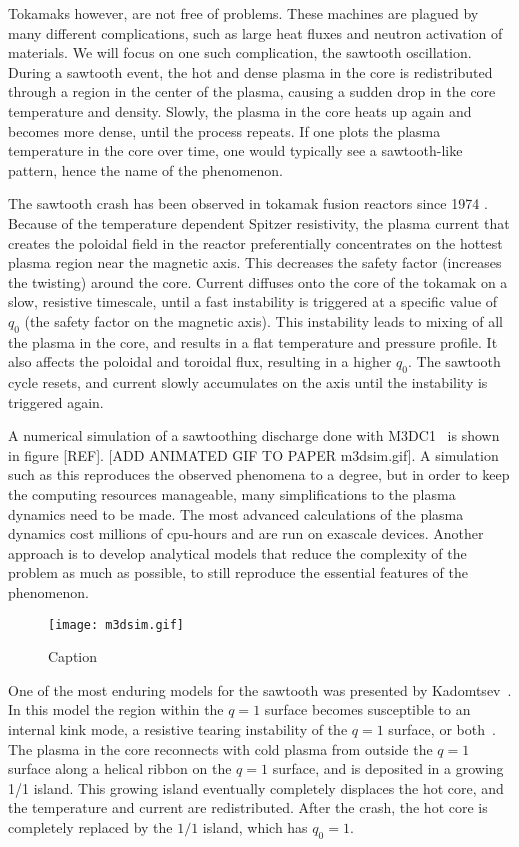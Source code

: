 \documentclass[%
superscriptaddress,
amsmath,amssymb,
aps,
pre,
floatfix,
]{revtex4-2}
\begin{document}
Tokamaks however, are not free of problems. These machines are plagued by many different complications, such as large heat fluxes and neutron activation of materials. We will focus on one such complication, the sawtooth oscillation. During a sawtooth event, the hot and dense plasma in the core is redistributed through a region in the center of the plasma, causing a sudden drop in the core temperature and density. Slowly, the plasma in the core heats up again and becomes more dense, until the process repeats. If one plots the plasma temperature in the core over time, one would typically see a sawtooth-like pattern, hence the name of the phenomenon.

The sawtooth crash has been observed in tokamak fusion reactors since 1974 \cite{von1974studies, vershkov1974role}.
Because of the temperature dependent Spitzer resistivity, the plasma current that creates the poloidal field in the reactor preferentially concentrates on the hottest plasma region near the magnetic axis.
This decreases the safety factor (increases the twisting) around the core.
Current diffuses onto the core of the tokamak on a slow, resistive timescale, until a fast instability is triggered at a specific value of $q_0$ (the safety factor on the magnetic axis).
This instability leads to mixing of all the plasma in the core, and results in a flat temperature and pressure profile.
It also affects the poloidal and toroidal flux, resulting in a higher $q_0$.
The sawtooth cycle resets, and current slowly accumulates on the axis until the instability is triggered again.

A numerical simulation of a sawtoothing discharge done with M3DC1~\cite{jardin2012multiple} is shown in figure [REF]. [ADD ANIMATED GIF TO PAPER m3dsim.gif]. 
A simulation such as this reproduces the observed phenomena to a degree, but in order to keep the computing resources manageable, many simplifications to the plasma dynamics need to be made. 
The most advanced calculations of the plasma dynamics cost millions of cpu-hours and are run on exascale devices. 
Another approach is to develop analytical models that reduce the complexity of the problem as much as possible, to still reproduce the essential features of the phenomenon. 

\begin{figure}
    \centering
    \texttt{[image: m3dsim.gif]}
    \caption{Caption}
    \label{fig:my_label}
\end{figure}

One of the most enduring models for the sawtooth was presented by Kadomtsev~\cite{kadomtsev1975disruptive}.
In this model the region within the $q=1$ surface becomes susceptible to an internal kink mode, a resistive tearing instability of the $q=1$ surface, or both~\cite{coppi1976resistive}.
The plasma in the core reconnects with cold plasma from outside the $q=1$ surface along a helical ribbon on the $q=1$ surface, and is deposited in a growing 1/1 island.
This growing island eventually completely displaces the hot core, and the temperature and current are redistributed.
After the crash, the hot core is completely replaced by the $1/1$ island, which has $q_0=1$.
\end{document}
